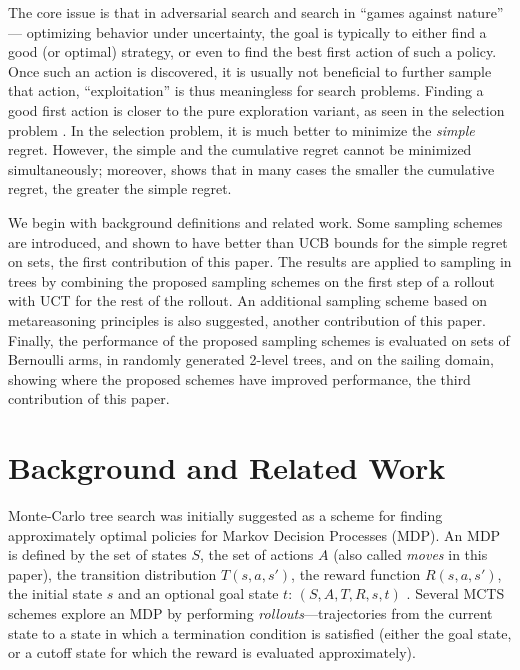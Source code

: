 \documentclass[letterpaper]{article}
\begin{document}
The core issue is that in adversarial search
and search in ``games against nature'' --- optimizing behavior under
uncertainty, the goal is typically to either find a good (or optimal)
strategy, or even to find the best first action of such a policy. Once
such an action is discovered, it is usually not beneficial to further sample
that action, ``exploitation'' is thus meaningless for search
problems. Finding a good first action is closer to the pure
exploration variant, as seen in the selection problem
\cite{Bubeck.pure,TolpinShimony.blinkered}. In the selection problem,
it is much better to minimize the \emph{simple} regret.  However, the
simple and the cumulative regret cannot be minimized simultaneously;
moreover, \cite{Bubeck.pure} shows that in many cases the smaller the
cumulative regret, the greater the simple regret.

We begin with background definitions and related work. 
Some sampling schemes are introduced, and shown to have better than UCB
bounds for the simple regret on sets, the first contribution of this paper. 
The results are applied to sampling in trees by combining the proposed sampling schemes on the
first step of a rollout with UCT for the rest of the
rollout. An additional sampling scheme based on metareasoning 
principles is also suggested, another contribution
of this paper.
Finally, the performance of the
proposed sampling schemes is evaluated on sets of Bernoulli arms, in randomly
generated 2-level trees, and on the sailing domain, showing where the proposed schemes have improved
performance, the third contribution of this paper.

\section{Background and Related Work}
\label{sec:related-work}

Monte-Carlo tree search was initially suggested as a scheme for
finding approximately optimal policies for Markov Decision Processes
(MDP).  An MDP is defined by the set of states $S$, the set of actions
$A$ (also called {\em moves} in this paper),
the transition distribution $T(s, a, s')$, the reward function $R(s, a,
s')$, the initial state $s$ and an optional goal state $t$: $(S, A, T, R, s,
t)$ \cite{Russell.aima}.  Several MCTS schemes explore an MDP by
performing \emph{rollouts}---trajectories from the current state to a
state in which a termination condition is satisfied (either the goal
state, or a cutoff state for which the reward is evaluated
approximately).
\end{document}
